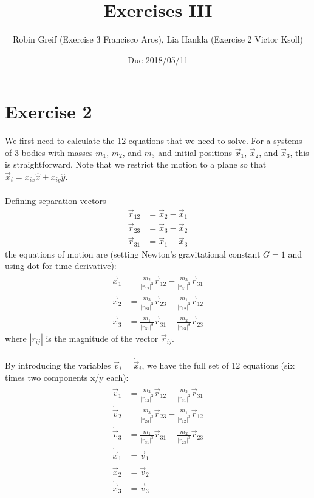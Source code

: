 \documentclass[12pt,a4paper,twoside]{article}
\title{Exercises III}
\author{Robin Greif (Exercise 3 Francisco Aros), Lia Hankla (Exercise 2 Victor Ksoll)}
\date{Due 2018/05/11}
\begin{document}
\maketitle

\section*{Exercise 2}
We first need to calculate the 12 equations that we need to solve. For a systems of 3-bodies with masses $m_1$, $m_2$, and $m_3$ and initial positions $\vec x_1$, $\vec x_2$, and $\vec x_3$, this is straightforward. Note that we restrict the motion to a plane so that $\vec x_i = x_{ix}\hat x + x_{iy}\hat y$.\\
\\
Defining separation vectors
\begin{align*}
  \vec r_{12} &= \vec x_2 - \vec x_1\\
  \vec r_{23} &= \vec x_3 - \vec x_2\\
  \vec r_{31} &= \vec x_1 - \vec x_3
\end{align*}
the equations of motion are (setting Newton's gravitational constant $G=1$ and using dot for time derivative):
\begin{align*}
  \ddot{\vec x}_1 &= \frac{m_2}{|r_{12}|^3}\vec r_{12}-\frac{m_3}{|r_{31}|^3}\vec r_{31}\\
  \ddot {\vec x}_2 &= \frac{m_3}{|r_{23}|^3}\vec r_{23}-\frac{m_1}{|r_{12}|^3}\vec r_{12}\\
  \ddot {\vec x}_3 &= \frac{m_1}{|r_{31}|^3}\vec r_{31}-\frac{m_2}{|r_{23}|^3}\vec r_{23}
\end{align*}
where $|r_{ij}|$ is the magnitude of the vector $\vec r_{ij}$.\\
\\
By introducing the variables $\vec v_{i} = \dot{\vec x}_i$, we have the full set of 12 equations (six times two components x/y each):
\begin{align*}
  \dot {\vec v}_1 &= \frac{m_2}{|r_{12}|^3}\vec r_{12}-\frac{m_3}{|r_{31}|^3}\vec r_{31}\\
  \dot {\vec v}_2 &= \frac{m_3}{|r_{23}|^3}\vec r_{23}-\frac{m_1}{|r_{12}|^3}\vec r_{12}\\
  \dot {\vec v}_3 &= \frac{m_1}{|r_{31}|^3}\vec r_{31}-\frac{m_2}{|r_{23}|^3}\vec r_{23}\\
  \dot {\vec x}_1 &= \vec v_1\\
  \dot {\vec x}_2 &= \vec v_2\\
  \dot {\vec x}_3 &= \vec v_3
\end{align*}
\end{document}
